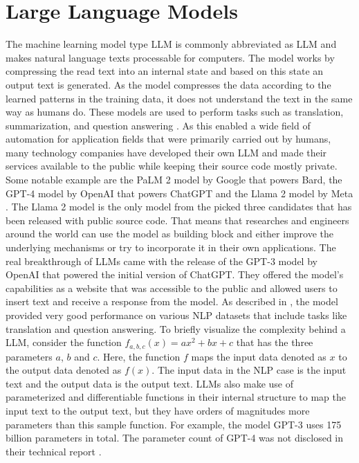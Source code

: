 \documentclass[draft,final]{thesisclass} %
\begin{document}
\section{Large Language Models}
The machine learning model type \gls{LLM} is commonly abbreviated as \acs{LLM} and makes natural language texts processable for computers.
The model works by compressing the read text into an internal state and based on this state an output text is generated.
As the model compresses the data according to the learned patterns in the training data, it does not understand the text in the same way as humans do.
These models are used to perform tasks such as translation, summarization, and question answering \cite[1]{llm_literature_review}.
As this enabled a wide field of automation for application fields that were primarily carried out by humans, many technology companies have developed their own \acs{LLM} and made their services available to the public while keeping their source code mostly private.
Some notable example are the PaLM 2 model by Google \cite{palm2} that powers Bard, the GPT-4 model by OpenAI \cite{gpt4} that powers ChatGPT and the Llama 2 model by Meta \cite{llama2}.
The Llama 2 model is the only model from the picked three candidates that has been released with public source code.
That means that researches and engineers around the world can use the model as building block and either improve the underlying mechanisms or try to incorporate it in their own applications.
The real breakthrough of \acs{LLM}s came with the release of the GPT-3 model by OpenAI \cite{gpt3} that powered the initial version of ChatGPT.
They offered the model's capabilities as a website that was accessible to the public and allowed users to insert text and receive a response from the model.
As described in \cite[1]{gpt3}, the model provided very good performance on various \acs{NLP} datasets that include tasks like translation and question answering.
To briefly visualize the complexity behind a \acs{LLM}, consider the function $f_{a,b,c}(x) = ax^2+bx+c$ that has the three parameters $a$, $b$ and $c$.
Here, the function $f$ maps the input data denoted as $x$ to the output data denoted as $f(x)$.
The input data in the \acs{NLP} case is the input text and the output data is the output text.
\acs{LLM}s also make use of parameterized and differentiable functions in their internal structure to map the input text to the output text, but they have orders of magnitudes more parameters than this sample function.
For example, the model GPT-3 uses 175 billion parameters \cite[1]{gpt3} in total. The parameter count of GPT-4 was not disclosed in their technical report \cite{gpt4}.
\end{document}
